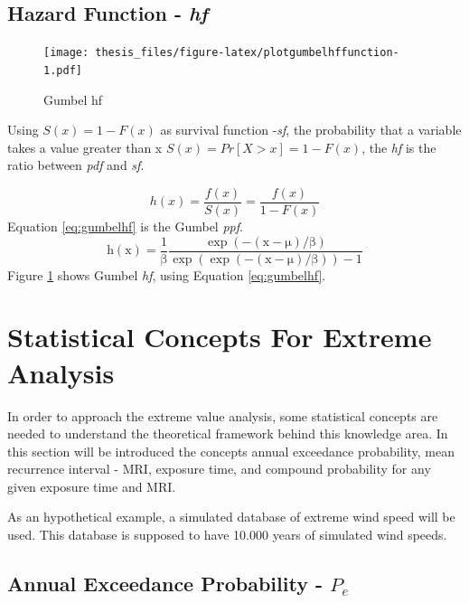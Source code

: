 \documentclass[12pt,oneside]{reedthesis}
\begin{document}
\hypertarget{hf}{%
\subsection{\texorpdfstring{Hazard Function - \emph{hf}}{Hazard Function - hf}}\label{hf}}

\footnotesize
\begin{figure}
\centering
\texttt{[image: thesis\_files/figure-latex/plotgumbelhffunction-1.pdf]}
\caption{\label{fig:plotgumbelhffunction}Gumbel hf}
\end{figure}
\normalsize

Using \(S(x) = 1 - F(x)\) as survival function -\emph{sf}, the probability that a variable takes a value greater than x \(S(x) = Pr[X > x] = 1 - F(x)\), the \emph{hf} is the ratio between \emph{pdf} and \emph{sf}.

\[
h(x) = \frac{f(x)}{S(x)} = \frac{f(x)}{1-F(x)}
\]
Equation \eqref{eq:gumbelhf} is the Gumbel \emph{ppf}.
\begin{equation}
\mathrm{
        h(x)= \frac{1}{\beta}\frac{\exp(-(x-\mu)/\beta)}{\exp(\exp(-(x-\mu)/\beta))-1}
       }
  \label{eq:gumbelhf}
\end{equation}
Figure \ref{fig:plotgumbelhffunction} shows Gumbel \emph{hf}, using Equation \eqref{eq:gumbelhf}.

\hypertarget{statistical-concepts-for-extreme-analysis}{%
\section{Statistical Concepts For Extreme Analysis}\label{statistical-concepts-for-extreme-analysis}}

In order to approach the extreme value analysis, some statistical concepts are needed to understand the theoretical framework behind this knowledge area. In this section will be introduced the concepts annual exceedance probability, mean recurrence interval - MRI, exposure time, and compound probability for any given exposure time and MRI.

As an hypothetical example, a simulated database of extreme wind speed will be used. This database is supposed to have 10.000 years of simulated wind speeds.

\hypertarget{annual-exceedance-probability---p_e}{%
\subsection{\texorpdfstring{Annual Exceedance Probability - \(P_e\)}{Annual Exceedance Probability - P\_e}}\label{annual-exceedance-probability---p_e}}
\end{document}
